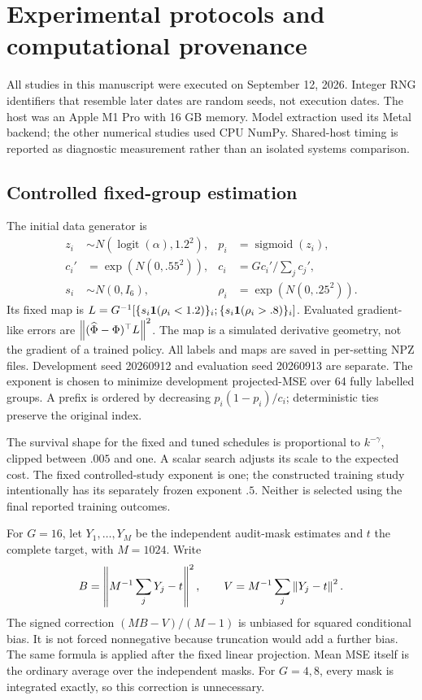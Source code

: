 \section{Experimental protocols and computational provenance}\label{app:protocol}
All studies in this manuscript were executed on September 12, 2026. Integer RNG identifiers that resemble later dates are random seeds, not execution dates. The host was an Apple M1 Pro with 16 GB memory. Model extraction used its Metal backend; the other numerical studies used CPU NumPy. Shared-host timing is reported as diagnostic measurement rather than an isolated systems comparison.

\subsection{Controlled fixed-group estimation}
The initial data generator is
\begin{align*}
 z_i&\sim N(\operatorname{logit}(\alpha),1.2^2),&p_i&=\operatorname{sigmoid}(z_i),\\
 c_i'&=\exp(N(0,.55^2)),&c_i&=Gc_i'/\sum_jc_j',\\
 s_i&\sim N(0,I_6),&\rho_i&=\exp(N(0,.25^2)).
\end{align*}
Its fixed map is $L=G^{-1}[\{s_i\mathbf 1(\rho_i<1.2)\}_i;\{s_i\mathbf 1(\rho_i>.8)\}_i]$. Evaluated gradient-like errors are $\left\lVert(\widehat\Phi-\Phi)^\top L\right\rVert^2$. The map is a simulated derivative geometry, not the gradient of a trained policy. All labels and maps are saved in per-setting NPZ files. Development seed 20260912 and evaluation seed 20260913 are separate. The exponent is chosen to minimize development projected-MSE over 64 fully labelled groups. A prefix is ordered by decreasing $p_i(1-p_i)/c_i$; deterministic ties preserve the original index.

The survival shape for the fixed and tuned schedules is proportional to $k^{-\gamma}$, clipped between $.005$ and one. A scalar search adjusts its scale to the expected cost. The fixed controlled-study exponent is one; the constructed training study intentionally has its separately frozen exponent $.5$. Neither is selected using the final reported training outcomes.

For $G=16$, let $Y_1,\ldots,Y_M$ be the independent audit-mask estimates and $t$ the complete target, with $M=1024$. Write
\[
 B=\left\lVert M^{-1}\sum_jY_j-t\right\rVert^2,\qquad
 V=M^{-1}\sum_j\left\lVert Y_j-t\right\rVert^2.
\]
The signed correction $(MB-V)/(M-1)$ is unbiased for squared conditional bias. It is not forced nonnegative because truncation would add a further bias. The same formula is applied after the fixed linear projection. Mean MSE itself is the ordinary average over the independent masks. For $G=4,8$, every mask is integrated exactly, so this correction is unnecessary.

